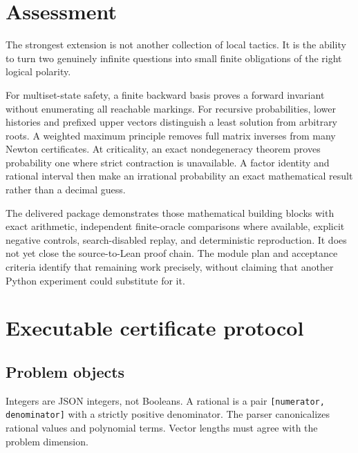 \documentclass[11pt,a4paper]{article}
\theoremstyle{definition}\newtheorem{definition}[theorem]{Definition}
\theoremstyle{remark}\newtheorem{remark}[theorem]{Remark}
\newcommand{\code}[1]{\nolinkurl{#1}}
\begin{document}
\section{Assessment}
The strongest extension is not another collection of local tactics. It is the ability to turn two genuinely infinite questions into small finite obligations of the right logical polarity.

For multiset-state safety, a finite backward basis proves a forward invariant without enumerating all reachable markings. For recursive probabilities, lower histories and prefixed upper vectors distinguish a least solution from arbitrary roots. A weighted maximum principle removes full matrix inverses from many Newton certificates. At criticality, an exact nondegeneracy theorem proves probability one where strict contraction is unavailable. A factor identity and rational interval then make an irrational probability an exact mathematical result rather than a decimal guess.

The delivered package demonstrates those mathematical building blocks with exact arithmetic, independent finite-oracle comparisons where available, explicit negative controls, search-disabled replay, and deterministic reproduction. It does not yet close the source-to-Lean proof chain. The module plan and acceptance criteria identify that remaining work precisely, without claiming that another Python experiment could substitute for it.


\appendix

\section{Executable certificate protocol}
\subsection{Problem objects}
Integers are JSON integers, not Booleans. A rational is a pair \code{[numerator, denominator]} with a strictly positive denominator. The parser canonicalizes rational values and polynomial terms. Vector lengths must agree with the problem dimension.
\end{document}
